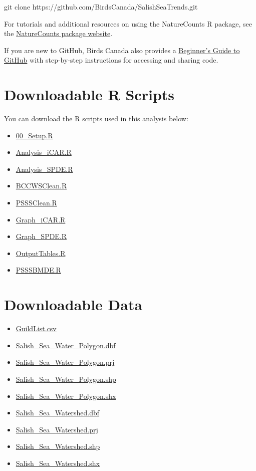 \documentclass[
  letterpaper,
  DIV=11,
  numbers=noendperiod]{scrreprt}
\providecommand{\tightlist}{%
  \setlength{\itemsep}{0pt}\setlength{\parskip}{0pt}}\usepackage{longtable,booktabs,array}
\begin{document}
git clone https://github.com/BirdsCanada/SalishSeaTrends.git

For tutorials and additional resources on using the NatureCounts R
package, see the
\href{https://birdscanada.github.io/naturecounts/articles/index.html}{NatureCounts
package website}.

If you are new to GitHub, Birds Canada also provides a
\href{https://birdscanada.github.io/BirdsCanada_GitHubGuide/}{Beginner's
Guide to GitHub} with step-by-step instructions for accessing and
sharing code.

\section{Downloadable R Scripts}\label{9.91BirdsCan}

You can download the R scripts used in this analysis below:

\begin{itemize}
\tightlist
\item
  \href{Scripts/00_Setup.R}{00\_Setup.R}
\item
  \href{Scripts/Analysis_iCAR.R}{Analysis\_iCAR.R}
\item
  \href{Scripts/Analysis_SPDE.R}{Analysis\_SPDE.R}
\item
  \href{Scripts/BCCWSClean.R}{BCCWSClean.R}
\item
  \href{Scripts/PSSSClean.R}{PSSSClean.R}
\item
  \href{Scripts/Graph_iCAR.R}{Graph\_iCAR.R}
\item
  \href{Scripts/Graph_SPDE.R}{Graph\_SPDE.R}
\item
  \href{Scripts/OutputTables.R}{OutputTables.R}
\item
  \href{Scripts/PSSSBMDE.R}{PSSSBMDE.R}
\end{itemize}

\section{Downloadable Data}\label{9.92BirdsCan}

\begin{itemize}
\tightlist
\item
  \href{Data/GuildList.csv}{GuildList.csv}
\item
  \href{Data/Spatial/Salish_Sea_Water_Polygon.dbf}{Salish\_Sea\_Water\_Polygon.dbf}
\item
  \href{Data/Spatial/Salish_Sea_Water_Polygon.prj}{Salish\_Sea\_Water\_Polygon.prj}
\item
  \href{Data/Spatial/Salish_Sea_Water_Polygon.shp}{Salish\_Sea\_Water\_Polygon.shp}
\item
  \href{Data/Spatial/Salish_Sea_Water_Polygon.shx}{Salish\_Sea\_Water\_Polygon.shx}
\item
  \href{Data/Spatial/Salish_Sea_Watershed.dbf}{Salish\_Sea\_Watershed.dbf}
\item
  \href{Data/Spatial/Salish_Sea_Watershed.prj}{Salish\_Sea\_Watershed.prj}
\item
  \href{Data/Spatial/Salish_Sea_Watershed.shp}{Salish\_Sea\_Watershed.shp}
\item
  \href{Data/Spatial/Salish_Sea_Watershed.shx}{Salish\_Sea\_Watershed.shx}
\end{itemize}
\end{document}
